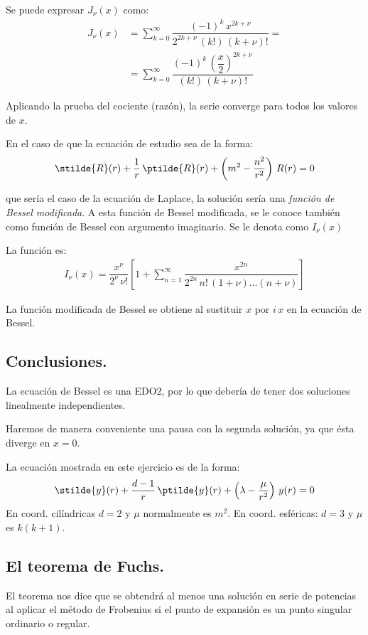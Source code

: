 Se puede expresar $J_{\nu}(x)$ como:
\begin{align*}
J_{\nu}(x) &= \sum_{k=0}^{\infty} \dfrac{(-1)^{k} \, x^{2k+\nu}}{2^{2k+\nu} \, (k!) \, (k + \nu)!} = \\[1em]
&= \sum_{k=0}^{\infty} \dfrac{(-1)^{k} \, \left( \dfrac{x}{2}\right)^{2k+\nu}}{(k!) \, (k + \nu)!}
\end{align*}

Aplicando la prueba del cociente (razón), la serie converge para todos los valores de $x$.

En el caso de que la ecuación de estudio sea de la forma:
\begin{align*}
\stilde{R} (r) + \dfrac{1}{r} \, \ptilde{R} (r) + \left( m^{2} - \dfrac{n^{2}}{r^{2}} \right) \, R(r) = 0
\end{align*}

que sería el caso de la ecuación de Laplace, la solución sería una \emph{función de Bessel modificada}. A esta función de Bessel modificada, se le conoce también como función de Bessel con argumento imaginario. Se le denota como $I_{\nu}(x)$

La función es:
\begin{align*}
I_{\nu}(x) = \dfrac{x^{\nu}}{2^{\nu} \, \nu!} \left[ 1 + \sum_{n=1}^{\infty} \dfrac{x^{2n}}{2^{2n} \, n! \, (1 + \nu) \ldots (n + \nu)} \right]
\end{align*}

La función modificada de Bessel se obtiene al sustituir $x$ por $i \, x$ en la ecuación de Bessel.

\subsection*{Conclusiones.}

La ecuación de Bessel es una EDO2, por lo que debería de tener dos soluciones linealmente independientes.

Haremos de manera conveniente una pausa con la segunda solución, ya que ésta diverge en $x=0$.

La ecuación mostrada en este ejercicio es de la forma:
\begin{align*}
\stilde{y}(r) + \dfrac{d - 1}{r} \, \ptilde{y}(r) + \left( \lambda - \dfrac{\mu}{r^{2}} \right) \, y(r) = 0
\end{align*}
En coord. cilíndricas $d = 2$ y $\mu$ normalmente es $m^{2}$. En coord. esféricas: $d = 3$ y $\mu$ es $k(k+1)$.

\subsection{El teorema de Fuchs.}
El teorema nos dice que se obtendrá al menos una solución en serie de potencias al aplicar el método de Frobenius si el punto de expansión es un punto singular ordinario o regular. 

